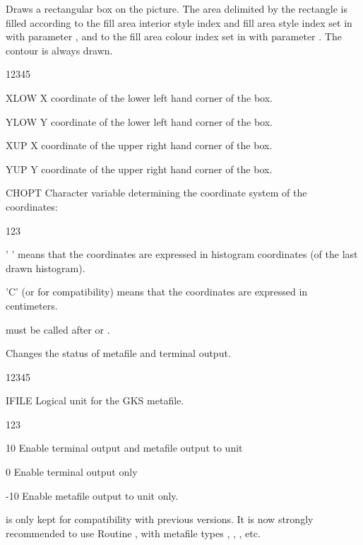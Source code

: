 \Action
Draws a rectangular box on the picture. The area delimited by the rectangle is
filled according to the fill area interior style index and fill area style index
set in  with parameter , and to the fill area colour
index set in  with parameter . The contour is always
drawn.
\Pdesc
\begin{DLtt}{12345}
\item[XLOW]  X coordinate of the lower left hand corner of the box.
\item[YLOW]  Y coordinate of the lower left hand corner of the box.
\item[XUP]   X coordinate of the upper right hand corner of the box.
\item[YUP]   Y coordinate of the upper right hand corner of the box.
\item[CHOPT] Character variable determining the coordinate system of the
              coordinates:
\begin{DLtt}{123}
  \item[' '] means that the coordinates are expressed in histogram
             coordinates (of the last drawn histogram).
  \item['C'] (or  for compatibility) means that the coordinates are
             expressed in centimeters.
\end{DLtt}
\end{DLtt}
\Remark
{} must be called after  or .


\Action
Changes the status of metafile and terminal output.
\Pdesc
\begin{DLtt}{12345}
\item[IFILE] Logical unit for the GKS metafile.
\begin{DLtt}{123}
   \item[\phantom{0}10] Enable terminal output and metafile output to \FORTRAN{}
                        unit 
   \item[\phantom{00}0] Enable terminal output only
   \item[-10]           Enable metafile output to \FORTRAN{} unit 
                        only.
\end{DLtt}
\end{DLtt}
\Remark
{} is only kept for compatibility with previous versions. It is now
strongly recommended to use \HIGZ{} Routine 
, with metafile types , , ,
etc.

